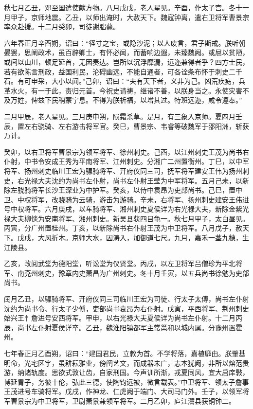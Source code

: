 \documentclass[12pt,UTF8]{ctexbook}
\begin{document}
秋七月乙丑，邓至国遣使献方物。八月戊戌，老人星见。辛酉，作太子宫。冬十一月甲子，京师地震。乙丑，以师出淹时，大赦天下。魏寇钟离，遣右卫将军曹景宗率众赴援。十二月癸卯，司徒谢朏薨。

六年春正月辛酉朔，诏曰：“径寸之宝，或隐沙泥；以人废言，君子斯戒。朕听朝晏罢，思阐政术，虽百辟卿士，有怀必闻，而蓄响边遐，未臻魏阙。或屈以贫陋，或间以山川，顿足延首，无因奏达。岂所以沉浮靡漏，远迩兼得者乎？四方士民，若有欲陈言刑政，益国利民，沦碍幽远，不能自通者，可各诠条布怀于刺史二千石。有可申采，大小以闻。”己卯，诏曰：“夫有天下者，义非为己。凶荒疾疬，兵革水火，有一于此，责归元首。今祝史请祷，继诸不善，以朕身当之。永使灾害不及万姓，俾兹下民稍蒙宁息。不得为朕祈福，以增其过。特班远迩，咸令遵奉。”

二月甲辰，老人星见。三月庚申朔，陨霜杀草。是月，有三象入京师。夏四月壬辰，置左右骁骑、左右游击将军官。癸巳，曹景宗、韦睿等破魏军于邵阳洲，斩获万计。

癸卯，以右卫将军曹景宗为领军将军、徐州刺史。己酉，以江州刺史王茂为尚书右仆射，中书令安成王秀为平南将军、江州刺史。分湘广二州置衡州。丁巳，以中军将军、扬州刺史临川王宏为骠骑将军、开府仪同三司，抚军将军建安王伟为扬州刺史，右光禄大夫沈约为尚书左仆射，尚书左仆射王莹为中军将军。五月己未，以新除左骁骑将军长沙王深业为中护军。癸亥，以侍中袁昂为吏部尚书。己巳，置中卫、中权将军，改骁骑为云骑，游击为游骑。辛未，右将军、扬州刺史建安王伟进号中权将军。六月庚戌，以车骑将军、湘州刺史夏侯详为右光禄大夫，新除金紫光禄大夫柳惔为安南将军、湘州刺史。新吴县获四目龟一。秋七月甲子，太白昼见。丙寅，分广州置桂州。丁亥，以新除尚书右仆射王茂为中卫将军。八月戊子，赦天下。戊戌，大风折木。京师大水，因涛入，加御道七尺。九月，嘉禾一茎九穗，生江陵县。

乙亥，改阅武堂为德阳堂，听讼堂为仪贤堂。丙戌，以左卫将军吕僧珍为平北将军、南兗州刺史，豫章内史萧昌为广州刺史。冬十月壬寅，以五兵尚书徐勉为吏部尚书。

闰月乙丑，以骠骑将军、开府仪同三司临川王宏为司徒、行太子太傅，尚书左仆射沈约为尚书令、行太子少傅，吏部尚书袁昂为右仆射。戊寅，平西将军、荆州刺史始兴王忄詹进号安西将军。甲申，以右光禄大夫夏侯详为尚书左仆射。十二月丙辰，尚书左仆射夏侯详卒。乙丑，魏淮阳镇都军主常邕和以城内属。分豫州置霍州。

七年春正月乙酉朔，诏曰：“建国君民，立教为首。不学将落，嘉植靡由。朕肇基明命，光宅区宇，虽耕耘雅业，傍阐艺文，而成器未广，志本犹阙，非所以熔范贵游，纳诸轨度。思欲式敦让齿，自家刑国。今声训所渐，戎夏同风，宜大启庠斅，博延胄子，务彼十伦，弘此三德，使陶钧远被，微言载表。”中卫将军、领太子詹事王茂进号车骑将军。戊戌，作神龙、仁虎阙于端门、大司马门外。壬子，以领军将军曹景宗为中卫将军，卫尉萧景兼领军将军。二月乙卯，庐江灊县获铜钟二。
\end{document}
